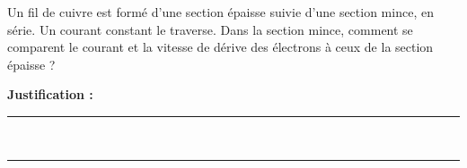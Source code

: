 Un fil de cuivre est formé d'une section épaisse suivie d'une section mince, en série. Un courant constant le traverse. Dans la section mince, comment se comparent le courant et la vitesse de dérive des électrons à ceux de la section épaisse ?

\choices

\noindent\textbf{Justification :} \hrulefill \\[2.5ex]
\rule{\linewidth}{0.4pt} \\[2.5ex]
\rule{\linewidth}{0.4pt}
\vfill
